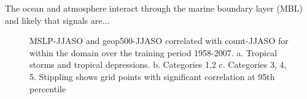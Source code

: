 The ocean and atmosphere interact through the marine boundary layer (MBL) and likely that signals are...

\begin{figure}
	\centering
	
	\caption{MSLP-JJASO and geop500-JJASO correlated with count-JJASO for within the domain over the training period 1958-2007. a. Tropical storms and tropical depressions. b. Categories 1,2 c. Categories 3, 4, 5. Stippling shows grid points with significant correlation at 95th percentile} \label{fig:corr_curr_JJASO_mslpgeop} 
\end{figure} 

